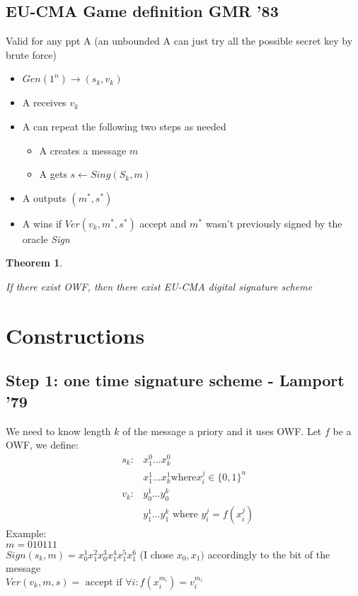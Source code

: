 \documentclass{article}
\newtheorem{thm}{Theorem}[section]
\newenvironment{theorem}{\begin{thm}\begin{rm}}%
{\end{rm}\end{thm}}
\begin{document}
\subsection{EU-CMA Game definition GMR '83}
Valid for any ppt A (an unbounded A can just try all the possible secret key by brute force)
\begin{itemize}
\item $Gen(1^n) \rightarrow (s_k,v_k)$
\item A receives $v_k$
\item A can repeat the following two steps as needed
\begin{itemize}
\item A creates a message $m$
\item A gets $s \leftarrow Sing(S_k, m)$
\end{itemize}
\item A outputs $(m^*,s^*)$
\item A wins if $Ver(v_k,m^*,s^*)$ accept and $m^*$ wasn't previously signed by the oracle \textit{Sign}
\end{itemize}

\begin{theorem}
If there exist OWF, then there exist EU-CMA digital signature scheme
\end{theorem}

\section{Constructions}
\subsection{Step 1: one time signature scheme - Lamport '79}
We need to know length $k$ of the message a priory and it uses OWF.
Let $f$ be a OWF, we define:
\begin{eqnarray}
& s_k: & x_1^0...x_k^0 \\\nonumber
& &  x_1^1...x_k^1 \text{where} x_i^j \in \{0,1\}^n\\\nonumber
& v_k: & y_0^1...y_0^k \\\nonumber
& &  y_1^1...y_1^k \text{ where } y_i^j = f(x_i^j)
\end{eqnarray}
Example: \\
$m = 010111$\\
$Sign(s_k,m) = x_0^1 x_1^2 x_0^3 x_1^4 x_1^5 x_1^6$ (I chose $x_0,x_1)$ accordingly to the bit of the message\\
$Ver(v_k,m,s) = \text{ accept if } \forall i: f(x_i^{m_i}) = v_i^{m_i}$
\end{document}
